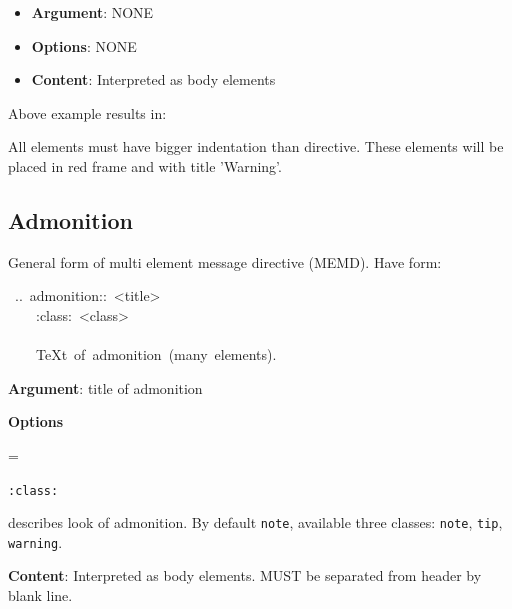 \documentclass[12pt]{article}
\newenvironment{deflist}[1]{%
\begin{list}{}
{\renewcommand{\makelabel}[1]{\textbf{##1}\hfill}
\settowidth{\labelwidth}{\textbf{#1}}
\leftmargin=\labelwidth
\advance \leftmargin\labelsep}}
{\end{list}}
\begin{document}
\begin{itemize}
\item
\textbf{Argument}: NONE

\item
\textbf{Options}: NONE

\item
\textbf{Content}: Interpreted as body elements
\end{itemize}

Above example results in:

\begin{center}
\end{center}

All elements must have bigger indentation than directive. These
elements will be placed in red frame and with title 'Warning'.

\hypertarget{ladmonition}{}
\subsection{Admonition}

General form of multi element message directive (MEMD). Have form:

\begin{ttfamily}\begin{flushleft}
\mbox{~..~admonition::~<title>}\\
\mbox{~~~~:class:~<class>}\\
\mbox{}\\
\mbox{~~~~\TeX{}t~of~admonition~(many~elements).}\\
\end{flushleft}\end{ttfamily}

\begin{itemize}
\item
\textbf{Argument}: title of admonition

\item
\textbf{Options}

 \begin{deflist}{iii}

\item[ \texttt{:class:}]

describes look of admonition. By default \texttt{note}, available three
classes: \texttt{note}, \texttt{tip}, \texttt{warning}.
\end{deflist}

\item
\textbf{Content}: Interpreted as body elements. MUST be separated from header by
blank line.
\end{itemize}
\end{document}
